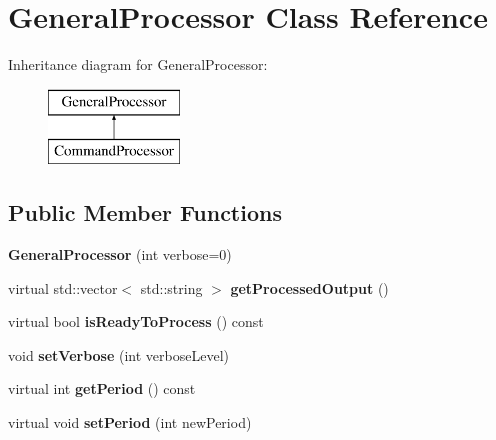 \hypertarget{classGeneralProcessor}{\section{General\-Processor Class Reference}
\label{classGeneralProcessor}
}
Inheritance diagram for General\-Processor\-:\begin{figure}[H]
\begin{center}
\leavevmode
\includegraphics[height=2.000000cm]{classGeneralProcessor}
\end{center}
\end{figure}
\subsection*{Public Member Functions}
\begin{DoxyCompactItemize}
\item 
\hypertarget{classGeneralProcessor_ae1eda776118e36f2062b1f16218e0cd8}{{\bfseries General\-Processor} (int verbose=0)}\label{classGeneralProcessor_ae1eda776118e36f2062b1f16218e0cd8}

\item 
\hypertarget{classGeneralProcessor_ac25327015ff4e08b1b195e08ca5c551e}{virtual std\-::vector$<$ std\-::string $>$ {\bfseries get\-Processed\-Output} ()}\label{classGeneralProcessor_ac25327015ff4e08b1b195e08ca5c551e}

\item 
\hypertarget{classGeneralProcessor_a4c33230d64d783e11925bb99ef4d3241}{virtual bool {\bfseries is\-Ready\-To\-Process} () const }\label{classGeneralProcessor_a4c33230d64d783e11925bb99ef4d3241}

\item 
\hypertarget{classGeneralProcessor_a676b026a03d5ba50da13d7be5eacd74a}{void {\bfseries set\-Verbose} (int verbose\-Level)}\label{classGeneralProcessor_a676b026a03d5ba50da13d7be5eacd74a}

\item 
\hypertarget{classGeneralProcessor_aa5b84927347553a13167bf49cf69be8e}{virtual int {\bfseries get\-Period} () const }\label{classGeneralProcessor_aa5b84927347553a13167bf49cf69be8e}

\item 
\hypertarget{classGeneralProcessor_ae57c2ab2c7cc2a67fd535d388c39e3de}{virtual void {\bfseries set\-Period} (int new\-Period)}\label{classGeneralProcessor_ae57c2ab2c7cc2a67fd535d388c39e3de}

\end{DoxyCompactItemize}
